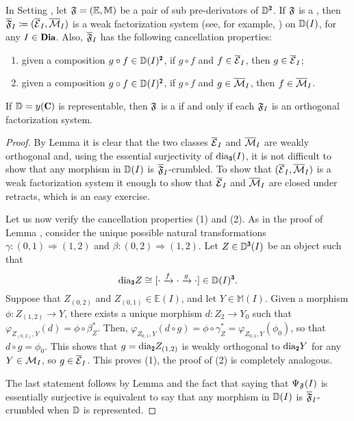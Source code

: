 \begin{lemma}\label{weak_and_cancellation}
In Setting , let $\mathfrak{F}=(\mathbb E,\mathbb M)$ be a pair of sub pre-derivators of $\D^\due$. If $\mathfrak{F}$ is a \dfs, then $\overline {\mathfrak{F}}_I \coloneqq (\overline{\mathcal{E}}_I,\overline {\mathcal{M}}_I)$ is a weak factorization system (see, for example, \cite[§\textbf{2}]{riehl2008factorization}) on $\mathbb{D}(I)$, for any $I\in \Dia$. Also, $\overline {\mathfrak{F}}_I$ has the following cancellation properties:
\begin{enumerate}
\item given a composition $g\circ f\in \D(I)^\due$, if $g\circ f$ and $f\in \overline{\mathcal{E}}_I$, then $g\in \overline{\mathcal{E}}_I$;
\item given a composition $g\circ f\in \D(I)^\due$, if $g\circ f$ and $g\in \overline{\mathcal{M}}_I$, then $f\in \overline{\mathcal{M}}_I$.
\end{enumerate}
If $\D=y(\C)$ is representable, then $\mathfrak{F}$ is a \dfs if and only if each $\mathfrak{F}_I$ is an orthogonal factorization system.
\end{lemma}
\begin{proof}
By Lemma  it is clear that the two classes $\overline{\mathcal{E}}_I$ and $\overline {\mathcal{M}}_I$ are weakly orthogonal and, using the essential surjectivity of $\dia_\tre(I)$, it is not difficult to show that any morphism in $\mathbb{D}(I)$ is $\overline{\mathfrak{F}}_I$-crumbled. To show that $(\overline{\mathcal{E}}_I,\overline {\mathcal{M}}_I)$ is a weak factorization system it enough to show that $\overline{\mathcal{E}}_I$ and $\overline {\mathcal{M}}_I$ are closed under retracts, which is an easy exercise. 

Let us now verify the cancellation properties (1) and (2). As in the proof of Lemma , consider the unique possible natural transformations $\gamma\colon (0,1)\Rightarrow (1,2)$ and $\beta\colon (0,2)\Rightarrow (1,2)$. Let $Z\in \D^\tre(I)$ be an object such that 
\[
\dia_{\tre}Z\cong[ \cdot \xto{f}\cdot\xto{g}\cdot]\in \D(I)^\tre.
\] 
Suppose that $Z_{(0,2)}$ and $Z_{(0,1)}\in \mathbb E(I)$, and let $Y\in \mathbb M(I)$. Given a morphism $\phi\colon Z_{(1,2)}\to Y$, there exists a unique morphism $d\colon Z_2\to Y_0$ such that $\varphi_{Z_{(0,2)},Y}(d)=\phi\circ \beta^*_Z$. Then, $\varphi_{Z_{0,1}, Y}(d\circ g)=\phi\circ\gamma^*_Z=\varphi_{Z_{0,1}, Y}(\phi_0)$, so that $d\circ g=\phi_0$. This shows that $g=\dia_{\due}Z_{(1,2)}$ is weakly orthogonal to $\dia_\due Y$ for any $Y\in \mathcal{M}_I$, so $g\in \overline {\mathcal{E}}_I$. This proves (1), the proof of (2) is completely analogous. 

The last statement follows by Lemma  and the fact that saying that $\Psi_{\mathfrak{F}}(I)$ is essentially surjective is equivalent to say that any morphism in $\mathbb{D}(I)$ is $\overline {\mathfrak{F}}_I$-crumbled when $\mathbb{D}$ is represented. 
\end{proof}

